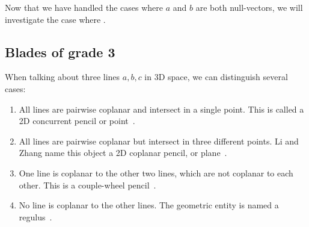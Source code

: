 Now that we have handled the cases where $a$ and $b$ are both null-vectors, we will investigate the case where .

\subsection{Blades of grade 3}
%
When talking about three lines $a, b, c$ in 3D space, we can distinguish several cases:

\begin{enumerate}[{Case} 1.]
  \item All lines are pairwise coplanar and intersect in a single point.  This is called a 2D concurrent pencil or point~\cite{Hongbo}.
  \item All lines are pairwise coplanar but intersect in three different points.  Li and Zhang name this object a 2D coplanar pencil, or plane~\cite{Hongbo}.
  \item One line is coplanar to the other two lines, which are not coplanar to each other.  This is a couple-wheel pencil~\cite{Hongbo}.
  \item No line is coplanar to the other lines.  The geometric entity is named a regulus~\cite[Section 3.3]{Pottmann}.
\end{enumerate}

